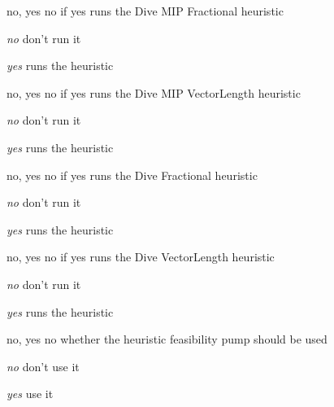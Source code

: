 %
{no, yes}%
{no}%
{if yes runs the Dive MIP Fractional heuristic}%
{\begin{list}{}{
\setlength{\parsep}{0em}
\setlength{\leftmargin}{3ex}
\setlength{\labelwidth}{1ex}
\setlength{\itemindent}{0ex}
\setlength{\topsep}{0pt}}
\item[\textit{no}] don't run it
\item[\textit{yes}] runs the heuristic
\end{list}
}

%
{no, yes}%
{no}%
{if yes runs the Dive MIP VectorLength heuristic}%
{\begin{list}{}{
\setlength{\parsep}{0em}
\setlength{\leftmargin}{3ex}
\setlength{\labelwidth}{1ex}
\setlength{\itemindent}{0ex}
\setlength{\topsep}{0pt}}
\item[\textit{no}] don't run it
\item[\textit{yes}] runs the heuristic
\end{list}
}

%
{no, yes}%
{no}%
{if yes runs the Dive Fractional heuristic}%
{\begin{list}{}{
\setlength{\parsep}{0em}
\setlength{\leftmargin}{3ex}
\setlength{\labelwidth}{1ex}
\setlength{\itemindent}{0ex}
\setlength{\topsep}{0pt}}
\item[\textit{no}] don't run it
\item[\textit{yes}] runs the heuristic
\end{list}
}

%
{no, yes}%
{no}%
{if yes runs the Dive VectorLength heuristic}%
{\begin{list}{}{
\setlength{\parsep}{0em}
\setlength{\leftmargin}{3ex}
\setlength{\labelwidth}{1ex}
\setlength{\itemindent}{0ex}
\setlength{\topsep}{0pt}}
\item[\textit{no}] don't run it
\item[\textit{yes}] runs the heuristic
\end{list}
}

%
{no, yes}%
{no}%
{whether the heuristic feasibility pump should be used}%
{\begin{list}{}{
\setlength{\parsep}{0em}
\setlength{\leftmargin}{3ex}
\setlength{\labelwidth}{1ex}
\setlength{\itemindent}{0ex}
\setlength{\topsep}{0pt}}
\item[\textit{no}] don't use it
\item[\textit{yes}] use it
\end{list}
}

